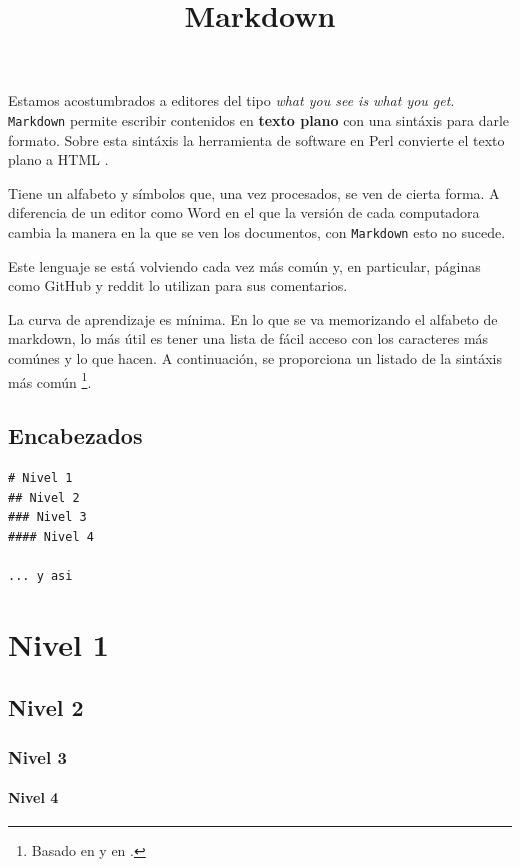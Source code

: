\documentclass[]{article}
\title{Markdown}
\author{}
\date{}
\let\oldparagraph\paragraph
\renewcommand{\paragraph}[1]{\oldparagraph{#1}\mbox{}}
\let\rmarkdownfootnote\footnote%
\def\footnote{\protect\rmarkdownfootnote}
\begin{document}
Estamos acostumbrados a editores del tipo \emph{what you see is what you
get}. \texttt{Markdown} permite escribir contenidos en \textbf{texto
plano} con una sintáxis para darle formato. Sobre esta sintáxis la
herramienta de software en Perl convierte el texto plano a HTML
\parencite{markdown}.

Tiene un alfabeto y símbolos que, una vez procesados, se ven de cierta
forma. A diferencia de un editor como Word en el que la versión de cada
computadora cambia la manera en la que se ven los documentos, con
\texttt{Markdown} esto no sucede.

Este lenguaje se está volviendo cada vez más común y, en particular,
páginas como GitHub y reddit lo utilizan para sus comentarios.

La curva de aprendizaje es mínima. En lo que se va memorizando el
alfabeto de markdown, lo más útil es tener una lista de fácil acceso con
los caracteres más comúnes y lo que hacen. A continuación, se
proporciona un listado de la sintáxis más común
\footnote{Basado en \textcite{markdowncheet1} y en \textcite{markdowncheet2}.}.

\subsection{Encabezados}\label{encabezados}

\begin{verbatim}
# Nivel 1
## Nivel 2
### Nivel 3
#### Nivel 4

... y asi
\end{verbatim}

\section{Nivel 1}\label{nivel-1}

\subsection{Nivel 2}\label{nivel-2}

\subsubsection{Nivel 3}\label{nivel-3}

\paragraph{Nivel 4}\label{nivel-4}
\end{document}
